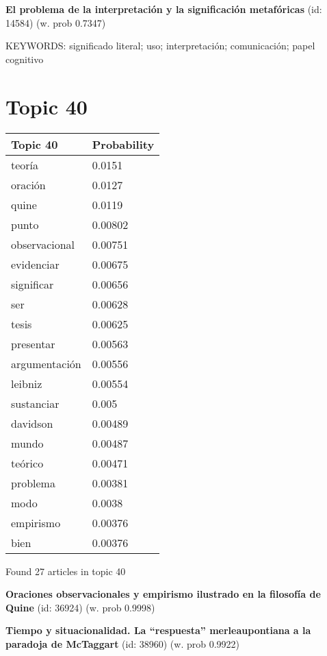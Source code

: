 \documentclass{article}
\begin{document}
\textbf{El problema de la interpretación y la significación metafóricas} (id: 14584)
 (w. prob 0.7347)


KEYWORDS:
significado literal; uso; interpretación; comunicación; papel cognitivo

\vfill
\newpage


\centering
\thispagestyle{empty}
\section*{Topic 40}\vfill
\begin{tabular}{ll}
\toprule
      Topic 40 & Probability \\
\midrule
        teoría &      0.0151 \\
       oración &      0.0127 \\
         quine &      0.0119 \\
         punto &     0.00802 \\
 observacional &     0.00751 \\
    evidenciar &     0.00675 \\
    significar &     0.00656 \\
           ser &     0.00628 \\
         tesis &     0.00625 \\
     presentar &     0.00563 \\
 argumentación &     0.00556 \\
       leibniz &     0.00554 \\
    sustanciar &       0.005 \\
      davidson &     0.00489 \\
         mundo &     0.00487 \\
       teórico &     0.00471 \\
      problema &     0.00381 \\
          modo &      0.0038 \\
     empirismo &     0.00376 \\
          bien &     0.00376 \\
\bottomrule
\end{tabular}

\vfill
Found 27 articles in topic 40
\vfill

\textbf{Oraciones observacionales y empirismo ilustrado en la filosofía de Quine} (id: 36924)
 (w. prob 0.9998)
\vfill

\textbf{Tiempo y situacionalidad. La “respuesta” merleaupontiana a la paradoja de McTaggart} (id: 38960)
 (w. prob 0.9922)
\vfill
\end{document}
